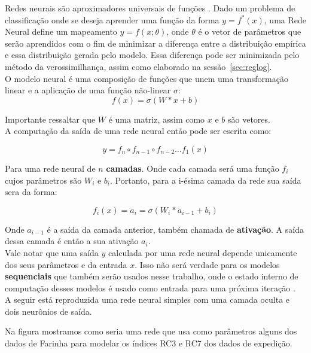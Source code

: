 Redes neurais são aproximadores universais de funções \citep{nnuni}. Dado um problema
de classificação onde se deseja aprender uma função da forma $y = f^*(x)$, uma
Rede Neural define um mapeamento $y = f(x ; \theta)$, onde $\theta$ é o vetor de
parâmetros que serão aprendidos com o fim de minimizar a diferença entre a
distribuição empírica e essa distribuição gerada pelo modelo. Essa diferença pode
ser minimizada pelo método da verossimilhança, assim como elaborado na sessão~\ref{sec:reglog}.\\

O modelo neural é uma composição de funções que unem uma transformação linear e
a aplicação de uma função não-linear $\sigma$: \\

\[ f(x)=  \sigma(W*x + b) \]

Importante ressaltar que $W$ é uma matriz, assim como $x$ e $b$ são vetores. \\

A computação da saída de uma rede neural então pode ser escrita como:

\[   y = f_n \circ f_{n-1} \circ f_{n-2} \dots f_1(x)  \]

Para uma rede neural de $n$ \textbf{camadas}. Onde cada camada será uma função
$f_i$ cujos parâmetros são $W_i$ e $b_i$. Portanto, para a i-ésima camada da rede
sua saída sera da forma: 

\[ f_i (x)=  a_i = \sigma(W_i*a_{i-1} + b_i) \]

Onde $a_{i-1}$ é a saída da camada anterior, também chamada de
\textbf{ativação}. A saída dessa camada é então a sua ativação $a_i$. \\ 

Vale notar que uma saída $y$ calculada por uma rede neural depende unicamente dos
seus parâmetros e da entrada $x$. Isso não será verdade para os modelos
\textbf{sequenciais} que também serão usados nesse trabalho, onde o estado
interno de computação desses modelos é usado como entrada para uma próxima
iteração \citep{dlbook}. \\

A seguir está reproduzida uma rede neural simples com uma camada oculta e dois neurônios de saída.


%


Na figura mostramos como seria uma rede que usa como parâmetros alguns dos dados de Farinha para modelar os índices RC3 e RC7 dos dados de expedição.

\bigskip


